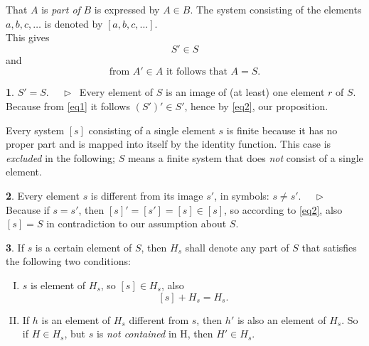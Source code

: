 \documentclass[leqno,hidelinks,a4paper]{article}
\theoremstyle{definition}
\newtheorem{satz}{\protect\satzname}
\newtheorem{deff}[satz]{\protect\deffname}
\newcommand{\satzname}{}
\newcommand{\deffname}{}
\renewcommand{\satzname}{\hspace{-4pt}.\ Satz}%
\renewcommand{\deffname}{\hspace{-4pt}.\ Definition}%
\renewcommand{\satzname}{\hspace{-4pt}.\ Theorem}%
\renewcommand{\deffname}{\hspace{-4pt}.\ Definition}%
\newcommand\Beweis{\medskip \newline $ \phantom{'.'} \rhd \ $}%
\newcommand{\partof}{\in}
\begin{document}
\begin{paracol}{2}
That $A$ is \emph{part of} $B$ is expressed by $A \partof B$. The system consisting
of the elements $a, b, c, \ldots$ is denoted by $[a, b, c, \ldots]$.
\ \\

This gives
\begin{equation}\label{eq1}
				S' \partof S
\end{equation}
and %
\begin{equation}\label{eq2}
		\text{from } A' \partof A \text{ it follows that } A = S.
\end{equation}


\begin{satz}\label{thm1}$S' = S$.
\Beweis
Every element of $S$ is an image of (at least) one element $r$ of $S$. Because
from \eqref{eq1} it follows $(S')' \partof S'$, hence by \eqref{eq2}, our proposition.
\end{satz}
Every system $[s]$ consisting of a single element $s$ is finite because it has
no proper part and is mapped into itself by the identity function. This case is
\emph{excluded} in the following; $S$ means a finite system that does \emph{not}
consist of a single element.
\smallskip

\begin{satz}\label{thm2}
Every element $s$ is different from its image $s'$, in symbols: $s \neq s'$.
\Beweis
Because if $s = s'$, then $[s]' = [s'] = [s] \partof [s]$, so according to
\eqref{eq2}, also $[s] = S$ in contradiction to our assumption about $S$.
\end{satz}

\newpage

\begin{deff}\label{def3}
If $s$ is a certain element of $S$, then $H_s$ shall denote any part of $S$ that
satisfies the following two conditions:
\vspace{8pt} %

\begin{enumerate}[I.]
\item $s$ is element of $H_s$, so $[s] \partof H_s$, also
\[
	[s] + H_s = H_s.
\]
\item If $h$ is an element of $H_s$ different from $s$, then $h'$ is also an
element of $H_s$. So if $H \partof H_s$, but $s$ is \emph{not contained} in H,
then $H' \partof H_s$.
\end{enumerate}
\end{deff}


\end{paracol}
\end{document}

